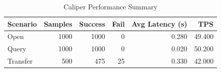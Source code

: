 \begin{table}
\caption{Caliper Performance Summary}
\label{tab:caliper_round}
\begin{tabular}{lrrrrr}
\toprule
Scenario & Samples & Success & Fail & Avg Latency (s) & TPS \\
\midrule
Open & 1000 & 1000 & 0 & 0.280 & 49.400 \\
Query & 1000 & 1000 & 0 & 0.020 & 50.200 \\
Transfer & 500 & 475 & 25 & 0.330 & 42.000 \\
\bottomrule
\end{tabular}
\end{table}
